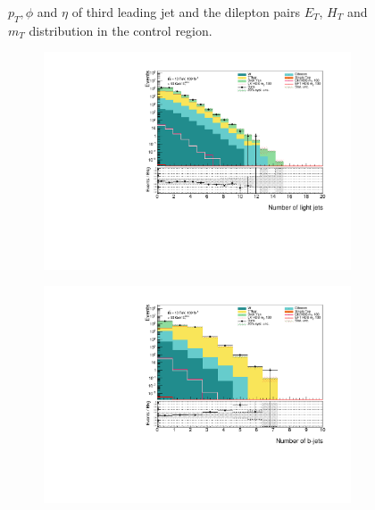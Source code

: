 \documentclass[12pt, a4paper]{book}
\begin{document}
\begin{figure}[!ht]
\begin{subfigure}[b]{0.49\textwidth}
    \end{subfigure}
    \caption{$p_T, \phi$ and $\eta$ of third leading jet and the dilepton pairs $E_T$, $H_T$ and $m_T$ distribution in the control region.}
\end{figure}
\begin{figure}[!ht]
    \centering
    \begin{subfigure}[b]{0.49\textwidth}
        \centering
        \includegraphics[width=\textwidth]{nLJet.pdf}
    \end{subfigure}
    \hfill
    \begin{subfigure}[b]{0.49\textwidth}
        \centering
        \includegraphics[width=\textwidth]{nBJet.pdf}
    \end{subfigure}
    \hfill
    \begin{subfigure}[b]{0.49\textwidth}

\end{subfigure}
\end{figure}
\end{document}
